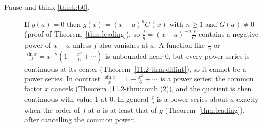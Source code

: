 \documentclass[11pt]{article}
\begin{document}
\begin{description}
  \item[Pause and think \ref{think:b0}.] If $g(a)=0$ then $g(x)=(x-a)^nG(x)$ with $n\ge1$ and $G(a)\ne0$ (proof of Theorem~\ref{thm:leading}), so $\frac fg=(x-a)^{-n}\frac fG$ contains a negative power of $x-a$ unless $f$ also vanishes at $a$. A function like $\frac1x$ or $\frac{\sin x}{x^3}=x^{-2}\left(1-\frac{x^2}6+\cdots\right)$ is unbounded near $0$, but every power series is continuous at its center (Theorem~\ref{11.2-thm:diffint}), so it cannot be a power series. In contrast $\frac{\sin x}x=1-\frac{x^2}6+\cdots$ is a power series: the common factor $x$ cancels (Theorem~\ref{11.2-thm:comb}(2)), and the quotient is then continuous with value $1$ at $0$. In general $\frac fg$ is a power series about $a$ exactly when the order of $f$ at $a$ is at least that of $g$ (Theorem~\ref{thm:leading}), after cancelling the common power.
\end{description}
\end{document}
